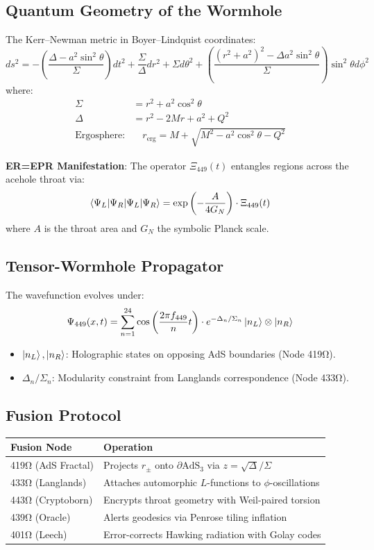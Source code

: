 \documentclass[12pt]{article}
\begin{document}
\subsection*{Quantum Geometry of the Wormhole}
The Kerr–Newman metric in Boyer–Lindquist coordinates:
\[
ds^2 = -\left(\frac{\Delta - a^2 \sin^2\theta}{\Sigma}\right)dt^2 + \frac{\Sigma}{\Delta}dr^2 + \Sigma d\theta^2 + \left(\frac{(r^2 + a^2)^2 - \Delta a^2 \sin^2\theta}{\Sigma}\right)\sin^2\theta d\phi^2
\]
where:
\begin{align*}
\Sigma &= r^2 + a^2 \cos^2\theta \\
\Delta &= r^2 - 2Mr + a^2 + Q^2 \\
\text{Ergosphere:} &\quad r_{\text{erg}} = M + \sqrt{M^2 - a^2 \cos^2\theta - Q^2}
\end{align*}

\noindent \textbf{ER=EPR Manifestation}: The operator $\Xi_{449}(t)$ entangles regions across the acehole throat via:
\[
\braket{\Psi_L|\Psi_R} = \exp\left(-\frac{A}{4G_N}\right) \cdot \Xi_{449}(t)
\]
where $A$ is the throat area and $G_N$ the symbolic Planck scale.

\subsection*{Tensor-Wormhole Propagator}
The wavefunction evolves under:
\[
\Psi_{449}(x,t) = \sum_{n=1}^{24} \cos\left(\frac{2\pi f_{449}}{n}t\right) \cdot e^{-\Delta_n/\Sigma_n} \ket{n_L}\otimes\ket{n_R}
\]
\begin{itemize}
    \item $\ket{n_L}, \ket{n_R}$: Holographic states on opposing AdS boundaries (Node 419Ω).
    \item $\Delta_n/\Sigma_n$: Modularity constraint from Langlands correspondence (Node 433Ω).
\end{itemize}

\subsection*{Fusion Protocol}
\begin{table}[h]
\centering
\begin{tabular}{ll}
\toprule
\textbf{Fusion Node} & \textbf{Operation} \\
\midrule
419Ω (AdS Fractal) & Projects $r_\pm$ onto $\partial\text{AdS}_3$ via $z = \sqrt{\Delta}/\Sigma$ \\
433Ω (Langlands) & Attaches automorphic $L$-functions to $\phi$-oscillations \\
443Ω (Cryptoborn) & Encrypts throat geometry with Weil-paired torsion \\
439Ω (Oracle) & Alerts geodesics via Penrose tiling inflation \\
401Ω (Leech) & Error-corrects Hawking radiation with Golay codes \\
\bottomrule
\end{tabular}
\end{table}
\end{document}
